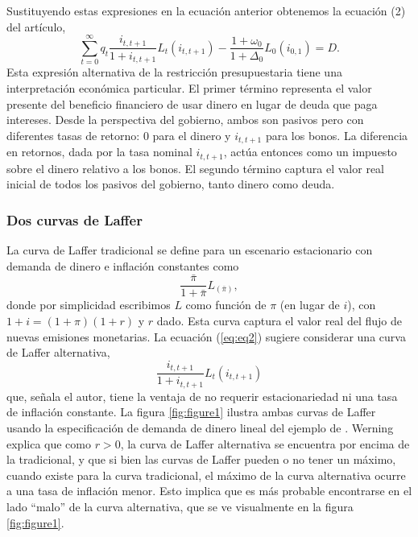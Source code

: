 \documentclass[../../entrega.tex]{subfiles}
\begin{document}
Sustituyendo estas expresiones en la ecuación anterior obtenemos la ecuación (2) del artículo,
\begin{equation}
    \sum_{t=0}^{\infty} q_t \frac{i_{t,t+1}}{1 + i_{t,t+1}}L_t(i_{t,t+1}) - \frac{1 + \omega_0}{1 + \Delta_0}L_0(i_{0,1}) = D.\label{eq:eq2}
\end{equation}
Esta expresión alternativa de la restricción presupuestaria tiene una interpretación económica particular.
El primer término representa el valor presente del beneficio financiero de usar dinero en lugar de deuda que paga intereses.
Desde la perspectiva del gobierno, ambos son pasivos pero con diferentes tasas de retorno: $0$ para el dinero y $i_{t,t+1}$ para los bonos.
La diferencia en retornos, dada por la tasa nominal $i_{t,t+1}$, actúa entonces como un impuesto sobre el dinero relativo a los bonos.
El segundo término captura el valor real inicial de todos los pasivos del gobierno, tanto dinero como deuda.

\subsubsection{Dos curvas de Laffer}
La curva de Laffer tradicional se define para un escenario estacionario con demanda de dinero e inflación constantes como
\begin{equation}
    \frac{\bar{\pi}}{1 + \bar{\pi}} L_(\bar{\pi}),
\end{equation}
donde por simplicidad escribimos $L$ como función de $\pi$ (en lugar de $i$), con $1 + i = (1 + \pi)(1 + r)$ y $r$ dado.
Esta curva captura el valor real del flujo de nuevas emisiones monetarias.
La ecuación (\ref{eq:eq2}) sugiere considerar una curva de Laffer alternativa,
\begin{equation}
    \frac{i_{t, t + 1}}{1 + i_{t, t + 1}} L_t(i_{t, t + 1})
\end{equation}
que, señala el autor, tiene la ventaja de no requerir estacionariedad ni una tasa de inflación constante.
La figura \ref{fig:figure1} ilustra ambas curvas de Laffer usando la especificación de demanda de dinero lineal del ejemplo de \textcite{sargent_unpleasant_1981}.
Werning explica que como $r > 0$, la curva de Laffer alternativa se encuentra por encima de la tradicional, y que si bien las curvas de Laffer pueden o no tener un máximo, cuando existe para la curva tradicional, el máximo de la curva alternativa ocurre a una tasa de inflación menor.
Esto implica que es más probable encontrarse en el lado ``malo'' de la curva alternativa, que se ve visualmente en la figura \ref{fig:figure1}.
\end{document}
